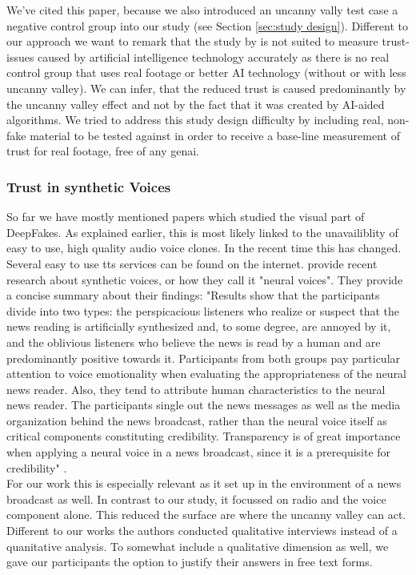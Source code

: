 \documentclass[
  a4paper,  %
  twoside,  %
  bibliography=totoc,
  headsepline,
  cleardoublepage=empty,
  parskip=half,
  draft=false
]{scrbook}
\begin{document}
We've cited this paper, because we also introduced an uncanny vally test case a negative control group into our study (see Section \ref{sec:study design}). Different to our approach we want to remark that the study by  is not suited to measure trust-issues caused by artificial intelligence technology accurately as there is no real control group that uses real footage or better AI technology (without or with less uncanny valley). We can infer, that the reduced trust is caused predominantly by the uncanny valley effect and not by the fact that it was created by AI-aided algorithms. We tried to address this study design difficulty by including real, non-fake material to be tested against in order to receive a base-line measurement of trust for real footage, free of any \gls{genai}.

\subsubsection*{Trust in synthetic Voices}
So far we have mostly mentioned papers which studied the visual part of DeepFakes. As explained earlier, this is most likely linked to the unavailiblity of easy to use, high quality audio voice clones. In the recent time this has changed. Several easy to use \gls{tts} services can be found on the internet.  provide recent research about synthetic voices, or how they call it "neural voices". They provide a concise summary about their findings: "Results show that the participants divide into two types: the perspicacious listeners who realize or suspect that the news reading is artificially synthesized and, to some degree, are annoyed by it, and the oblivious listeners who believe the news is read by a human and are predominantly positive towards it. Participants from both groups pay particular attention to voice emotionality when evaluating the appropriateness of the neural news reader. Also, they tend to attribute human characteristics to the neural news reader. The participants single out the news messages as well as the media organization behind the news broadcast, rather than the neural voice itself as critical components constituting credibility. Transparency is of great importance when applying a neural voice in a news broadcast, since it is a prerequisite for credibility" \cite{heiselbergAutomatedNewsReading2022}. \\
For our work this is especially relevant as it set up in the environment of a news broadcast as well. In contrast to our study, it focussed on radio and the voice component alone. This reduced the surface are where the uncanny valley can act. Different to our works the authors conducted qualitative interviews instead of a quanitative analysis. To somewhat include a qualitative dimension as well, we gave our participants the option to justify their answers in free text forms. 
\end{document}

